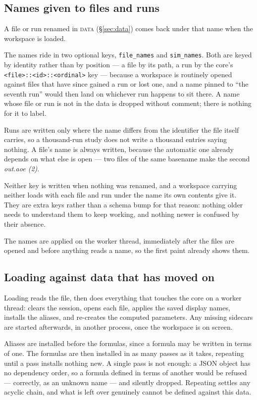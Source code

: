 \documentclass[11pt,a4paper,oneside]{report}
\newcommand{\code}[1]{\texttt{#1}}
\newcommand{\tab}[1]{\textsc{#1}}
\begin{document}
\subsection{Names given to files and runs}

A file or run renamed in \tab{data} (\S\ref{sec:data}) comes back under that
name when the workspace is loaded.

The names ride in two optional keys, \code{file\_names} and \code{sim\_names}.
Both are keyed by identity rather than by position --- a file by its path, a run
by the core's \code{<file>::<id>::<ordinal>} key --- because a workspace is
routinely opened against files that have since gained a run or lost one, and a
name pinned to ``the seventh run'' would then land on whichever run happens to sit
there. A name whose file or run is not in the data is dropped without comment;
there is nothing for it to label.

Runs are written only where the name differs from the identifier the file itself
carries, so a thousand-run study does not write a thousand entries saying
nothing. A file's name is always written, because the automatic one already
depends on what else is open --- two files of the same basename make the second
\emph{out.aoe (2)}.

Neither key is written when nothing was renamed, and a workspace carrying
neither loads with each file and run under the name its own contents give it.
They are extra keys rather than a schema bump for that reason: nothing older
needs to understand them to keep working, and nothing newer is confused by
their absence.

The names are applied on the worker thread, immediately after the files are
opened and before anything reads a name, so the first paint already shows them.

\subsection{Loading against data that has moved on}

Loading reads the file, then does everything that touches the core on a worker
thread: clears the session, opens each file, applies the saved display names,
installs the aliases, and re-creates the computed parameters. Any missing
sidecars are started afterwards, in another process, once the workspace is on
screen.

Aliases are installed before the formulas, since a formula may be written in
terms of one. The formulas are then installed in as many passes as it takes,
repeating until a pass installs nothing new. A single pass is not enough: a JSON
object has no dependency order, so a formula defined in terms of another would be
refused --- correctly, as an unknown name --- and silently dropped. Repeating
settles any acyclic chain, and what is left over genuinely cannot be defined
against this data.
\end{document}
